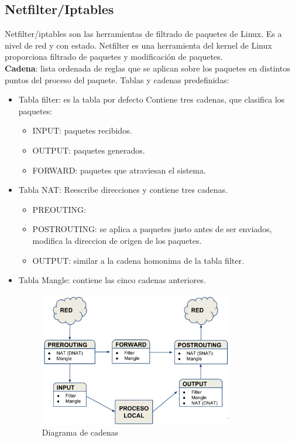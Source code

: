 \subsection{Netfilter/Iptables}
Netfilter/iptables son las herramientas de filtrado de paquetes de Linux.
Es a nivel de red y con estado. Netfilter es una herramienta del kernel de Linux proporciona filtrado de paquetes y modificación de paquetes.
\\
\textbf{Cadena}: lista ordenada de reglas que se aplican sobre los paquetes en distintos puntos del proceso del paquete.
Tablas y cadenas predefinidas:
\begin{itemize}
    \item Tabla filter: es la tabla por defecto
        Contiene tres cadenas, que clasifica los paquetes:
        \begin{itemize}
            \item INPUT: paquetes recibidos.
            \item OUTPUT: paquetes generados.
            \item FORWARD: paquetes que atraviesan el sistema.
        \end{itemize}
    
    \item Tabla NAT: Reescribe direcciones y contiene tres cadenas.
            \begin{itemize}
                \item PREOUTING:
                \item POSTROUTING: se aplica a paquetes justo antes de ser enviados, modifica la direccion de origen de los paquetes.
                \item OUTPUT: similar a la cadena homonima de la tabla filter.
            \end{itemize}
    \item Tabla Mangle: contiene las cinco cadenas anteriores.
    
    \begin{figure}[H]
        \centering
        \includegraphics[width=0.8\textwidth]{img/GraficoCadenas.PNG}
        \caption{Diagrama de cadenas}
    \end{figure}
    

\end{itemize}
